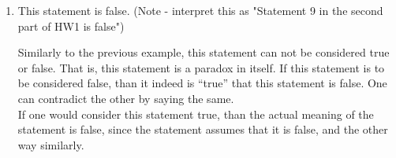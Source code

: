 \documentclass[english]{report}
\begin{document}
\begin{enumerate}
\item This statement is false. (Note - interpret this as "Statement 9 in the second part of HW1 is false")

  Similarly to the previous example, this statement can not be considered true or false. That is, this statement is a paradox in itself. If this statement is to be considered false, than it indeed is ``true'' that this statement is false. One can contradict the other by saying the same.
  \\
  If one would consider this statement true, than the actual meaning of the statement is false, since the statement assumes that it is false, and the other way similarly.

  
\end{enumerate}




\renewcommand{\bibname}{References}

\end{document}
